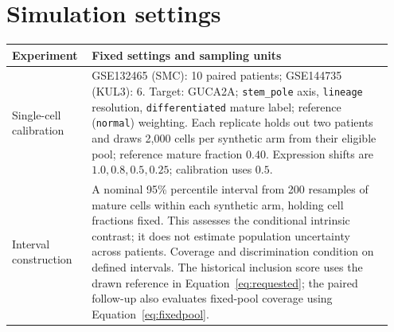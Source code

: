 \section{Simulation settings}
\label{app:methods}
\begin{center}
\small
\begin{tabular}{@{}p{0.19\linewidth}p{0.76\linewidth}@{}}
\toprule
\textbf{Experiment} & \textbf{Fixed settings and sampling units} \\
\midrule
Single-cell calibration &
GSE132465 (SMC): 10 paired patients; GSE144735 (KUL3): 6.
Target: GUCA2A; \texttt{stem\_pole} axis, \texttt{lineage} resolution,
\texttt{differentiated} mature label; reference (\texttt{normal}) weighting.
Each replicate holds out two patients and draws 2{,}000 cells per synthetic
arm from their eligible pool; reference mature fraction $0.40$.
Expression shifts are $1.0,0.8,0.5,0.25$; calibration uses $0.5$. \\
Interval construction &
A nominal 95\% percentile interval from 200 resamples of mature cells
within each synthetic arm, holding cell fractions fixed. This assesses the
conditional intrinsic contrast; it does not estimate population uncertainty
across patients. Coverage and discrimination condition on defined intervals. The historical inclusion score uses the drawn reference in
Equation~\ref{eq:requested}; the paired follow-up also evaluates fixed-pool
coverage using Equation~\ref{eq:fixedpool}. \\
\bottomrule
\end{tabular}
\end{center}
